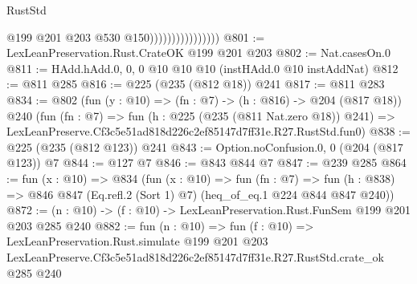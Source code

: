 \begin{lexlean}{RustStd}
\begin{coremodule}
                                    @199
                                    @201
                                    @203
                                    @530
                                    @150))))))))))))))))
@801 := LexLeanPreservation.Rust.CrateOK @199 @201 @203
@802 := Nat.casesOn.{0}
@811 := HAdd.hAdd.{0, 0, 0} @10 @10 @10 (instHAdd.{0} @10 instAddNat)
@812 := @811 @285
@816 := @225 (@235 (@812 @18)) @241
@817 := @811 @283
@834 := @802
    (fun (y : @10) => (fn : @7) -> (h : @816) -> @204 (@817 @18))
    @240
    (fun (fn : @7) =>
    fun (h : @225 (@235 (@811 Nat.zero @18)) @241) =>
    LexLeanPreserve.Cf3c5e51ad818d226c2ef85147d7ff31e.R27.RustStd.fun0)
@838 := @225 (@235 (@812 @123)) @241
@843 := Option.noConfusion.{0, 0} (@204 (@817 @123)) @7
@844 := @127 @7
@846 := @843 @844 @7
@847 := @239 @285
@864 := fun (x : @10) =>
  @834
    (fun (x : @10) =>
    fun (fn : @7) =>
    fun (h : @838) => @846 @847 (Eq.refl.{2} (Sort 1) @7) (heq_of_eq.{1} @224 @844 @847 @240))
@872 := (n : @10) -> (f : @10) -> LexLeanPreservation.Rust.FunSem @199 @201 @203 @285 @240
@882 := fun (n : @10) =>
  fun (f : @10) =>
  LexLeanPreservation.Rust.simulate
    @199
    @201
    @203
    LexLeanPreserve.Cf3c5e51ad818d226c2ef85147d7ff31e.R27.RustStd.crate_ok
    @285
    @240
\end{coremodule}
\end{lexlean}
